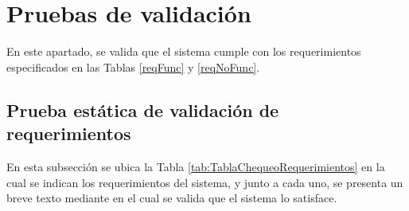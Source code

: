 




\section{Pruebas de validación}
\par En este apartado, se valida que el sistema cumple con los requerimientos especificados en las Tablas \ref{reqFunc} y \ref{reqNoFunc}.

 \subsection{Prueba estática de validación de requerimientos}
 
 En esta subsección se ubica la Tabla \ref{tab:TablaChequeoRequerimientos} en la cual se indican los requerimientos del sistema, y junto a cada uno, se presenta un breve texto mediante en el cual se valida que el sistema lo satisface.

